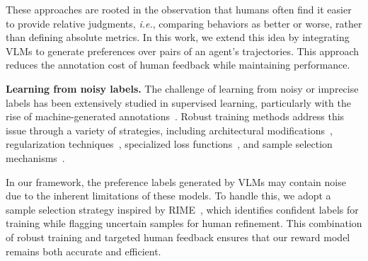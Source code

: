 These approaches are rooted in the observation that humans often find it easier to provide relative judgments, \emph{i.e.}, comparing behaviors as better or worse, rather than defining absolute metrics. 
In this work, we extend this idea by integrating VLMs to generate preferences over pairs of an agent's trajectories. 
This approach reduces the annotation cost of human feedback while maintaining performance.

\noindent \textbf{Learning from noisy labels.} 
The challenge of learning from noisy or imprecise labels has been extensively studied in supervised learning, particularly with the rise of machine-generated annotations~\cite{wang2022self}. Robust training methods address this issue through a variety of strategies, including architectural modifications~\cite{goldberger2017training}, regularization techniques~\cite{lukasik2020does}, specialized loss functions~\cite{zhang2018generalized}, and sample selection mechanisms~\cite{wang2021denoising}.

In our framework, the preference labels generated by VLMs may contain noise due to the inherent limitations of these models. To handle this, we adopt a sample selection strategy inspired by RIME~\cite{cheng2024rime}, which identifies confident labels for training while flagging uncertain samples for human refinement. This combination of robust training and targeted human feedback ensures that our reward model remains both accurate and efficient.


